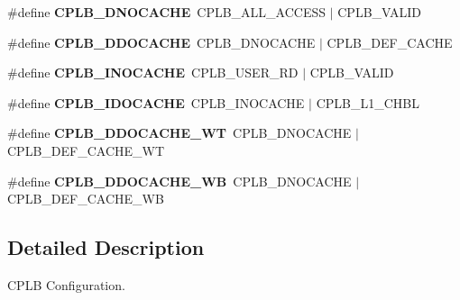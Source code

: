 \begin{DoxyCompactItemize}
\item 
\mbox{\label{group__ezkit533__cplb_ga72f24546dea2abff828ee2fa096a2a74}} 
\#define {\bfseries C\+P\+L\+B\+\_\+\+D\+N\+O\+C\+A\+C\+HE}~C\+P\+L\+B\+\_\+\+A\+L\+L\+\_\+\+A\+C\+C\+E\+SS $\vert$ C\+P\+L\+B\+\_\+\+V\+A\+L\+ID
\item 
\mbox{\label{group__ezkit533__cplb_ga1f2412705be4a4b8ca6b9cf1385934dd}} 
\#define {\bfseries C\+P\+L\+B\+\_\+\+D\+D\+O\+C\+A\+C\+HE}~C\+P\+L\+B\+\_\+\+D\+N\+O\+C\+A\+C\+HE $\vert$ C\+P\+L\+B\+\_\+\+D\+E\+F\+\_\+\+C\+A\+C\+HE
\item 
\mbox{\label{group__ezkit533__cplb_ga934f17af51c07482d66f7a02be0d3610}} 
\#define {\bfseries C\+P\+L\+B\+\_\+\+I\+N\+O\+C\+A\+C\+HE}~C\+P\+L\+B\+\_\+\+U\+S\+E\+R\+\_\+\+RD $\vert$ C\+P\+L\+B\+\_\+\+V\+A\+L\+ID
\item 
\mbox{\label{group__ezkit533__cplb_gab07d1b3d9324197d3e6bb29927b7b288}} 
\#define {\bfseries C\+P\+L\+B\+\_\+\+I\+D\+O\+C\+A\+C\+HE}~C\+P\+L\+B\+\_\+\+I\+N\+O\+C\+A\+C\+HE $\vert$ C\+P\+L\+B\+\_\+\+L1\+\_\+\+C\+H\+BL
\item 
\mbox{\label{group__ezkit533__cplb_ga0a8f090006ba9b886bfc032b65de2053}} 
\#define {\bfseries C\+P\+L\+B\+\_\+\+D\+D\+O\+C\+A\+C\+H\+E\+\_\+\+WT}~C\+P\+L\+B\+\_\+\+D\+N\+O\+C\+A\+C\+HE $\vert$ C\+P\+L\+B\+\_\+\+D\+E\+F\+\_\+\+C\+A\+C\+H\+E\+\_\+\+WT
\item 
\mbox{\label{group__ezkit533__cplb_gad2e788259927d6094b4b48c865593a65}} 
\#define {\bfseries C\+P\+L\+B\+\_\+\+D\+D\+O\+C\+A\+C\+H\+E\+\_\+\+WB}~C\+P\+L\+B\+\_\+\+D\+N\+O\+C\+A\+C\+HE $\vert$ C\+P\+L\+B\+\_\+\+D\+E\+F\+\_\+\+C\+A\+C\+H\+E\+\_\+\+WB
\end{DoxyCompactItemize}


\subsection{Detailed Description}
C\+P\+LB Configuration. 

